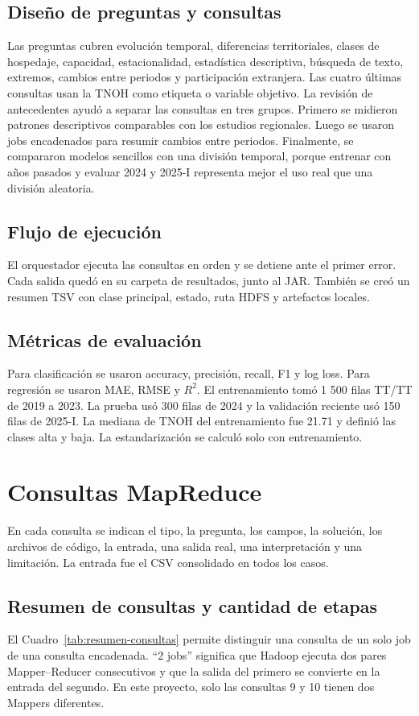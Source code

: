 \documentclass[10pt,a4paper]{article}
\theoremstyle{definition}
\begin{document}
\subsection{Diseño de preguntas y consultas}
Las preguntas cubren evolución temporal, diferencias territoriales, clases de
hospedaje, capacidad, estacionalidad, estadística descriptiva, búsqueda de
texto, extremos, cambios entre periodos y participación extranjera. Las cuatro
últimas consultas usan la TNOH como etiqueta o variable objetivo. La revisión
de antecedentes ayudó a separar las consultas en tres grupos. Primero se
midieron patrones descriptivos comparables con los estudios regionales. Luego
se usaron jobs encadenados para resumir cambios entre periodos. Finalmente, se
compararon modelos sencillos con una división temporal, porque entrenar con
años pasados y evaluar 2024 y 2025-I representa mejor el uso real que una
división aleatoria.

\subsection{Flujo de ejecución}
El orquestador ejecuta las consultas en orden y se detiene ante el primer
error. Cada salida quedó en su carpeta de resultados, junto al JAR. También se
creó un resumen TSV con clase principal, estado, ruta HDFS y artefactos locales.

\subsection{Métricas de evaluación}
Para clasificación se usaron accuracy, precisión, recall, F1 y log loss. Para
regresión se usaron MAE, RMSE y $R^2$. El entrenamiento tomó 1 500 filas TT/TT
de 2019 a 2023. La prueba usó 300 filas de 2024 y la validación reciente usó
150 filas de 2025-I. La mediana de TNOH del entrenamiento fue 21.71 y definió
las clases alta y baja. La estandarización se calculó solo con entrenamiento.

\section{Consultas MapReduce}
En cada consulta se indican el tipo, la pregunta, los campos, la solución, los
archivos de código, la entrada, una salida real, una interpretación y una
limitación. La entrada fue el CSV consolidado en todos los casos.

\subsection{Resumen de consultas y cantidad de etapas}
El Cuadro~\ref{tab:resumen-consultas} permite distinguir una consulta de un solo
job de una consulta encadenada. ``2 jobs'' significa que Hadoop ejecuta dos
pares Mapper--Reducer consecutivos y que la salida del primero se convierte en
la entrada del segundo. En este proyecto, solo las consultas 9 y 10 tienen dos
Mappers diferentes.
\end{document}
